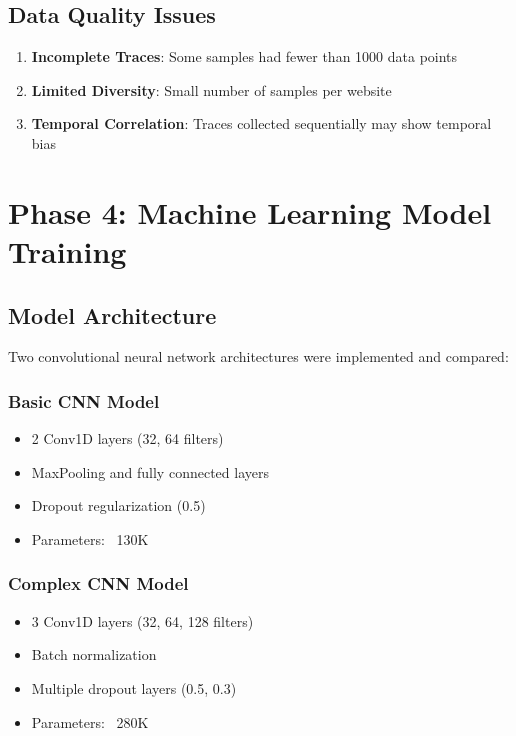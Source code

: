 \documentclass[11pt,a4paper]{article}
\begin{document}
\subsection{Data Quality Issues}
\begin{enumerate}
    \item \textbf{Incomplete Traces}: Some samples had fewer than 1000 data points
    \item \textbf{Limited Diversity}: Small number of samples per website
    \item \textbf{Temporal Correlation}: Traces collected sequentially may show temporal bias
\end{enumerate}

\section{Phase 4: Machine Learning Model Training}

\subsection{Model Architecture}
Two convolutional neural network architectures were implemented and compared:

\subsubsection{Basic CNN Model}
\begin{itemize}
    \item 2 Conv1D layers (32, 64 filters)
    \item MaxPooling and fully connected layers
    \item Dropout regularization (0.5)
    \item Parameters: ~130K
\end{itemize}

\subsubsection{Complex CNN Model}
\begin{itemize}
    \item 3 Conv1D layers (32, 64, 128 filters)
    \item Batch normalization
    \item Multiple dropout layers (0.5, 0.3)
    \item Parameters: ~280K
\end{itemize}
\end{document}
